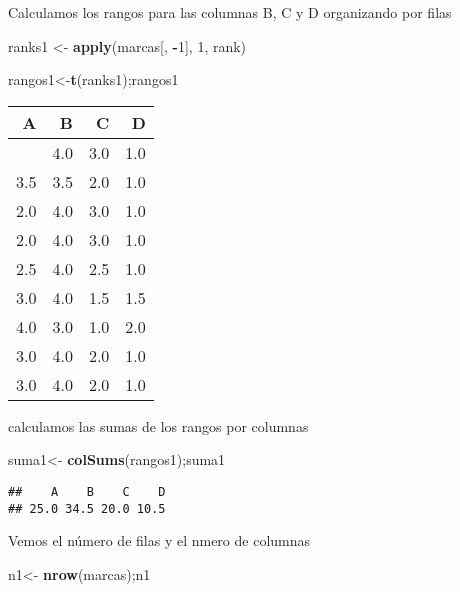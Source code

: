 \documentclass[
]{article}
\newenvironment{Shaded}{\begin{snugshade}}{\end{snugshade}}
\newcommand{\DecValTok}[1]{\textcolor[rgb]{0.00,0.00,0.81}{#1}}
\newcommand{\FunctionTok}[1]{\textcolor[rgb]{0.13,0.29,0.53}{\textbf{#1}}}
\newcommand{\NormalTok}[1]{#1}
\newcommand{\OtherTok}[1]{\textcolor[rgb]{0.56,0.35,0.01}{#1}}
\newcommand{\SpecialCharTok}[1]{\textcolor[rgb]{0.81,0.36,0.00}{\textbf{#1}}}
\begin{document}
Calculamos los rangos para las columnas B, C y D organizando por filas

\begin{Shaded}
\begin{Highlighting}[]
\NormalTok{ranks1 }\OtherTok{\textless{}{-}} \FunctionTok{apply}\NormalTok{(marcas[, }\SpecialCharTok{{-}}\DecValTok{1}\NormalTok{], }\DecValTok{1}\NormalTok{, rank)}


\NormalTok{rangos1}\OtherTok{\textless{}{-}}\FunctionTok{t}\NormalTok{(ranks1);rangos1}
\end{Highlighting}
\end{Shaded}

\begin{longtable}[]{@{}rrrr@{}}
\toprule\noalign{}
A & B & C & D \\
\midrule\noalign{}
\endhead
\bottomrule\noalign{}
\endlastfoot
2.0 & 4.0 & 3.0 & 1.0 \\
3.5 & 3.5 & 2.0 & 1.0 \\
2.0 & 4.0 & 3.0 & 1.0 \\
2.0 & 4.0 & 3.0 & 1.0 \\
2.5 & 4.0 & 2.5 & 1.0 \\
3.0 & 4.0 & 1.5 & 1.5 \\
4.0 & 3.0 & 1.0 & 2.0 \\
3.0 & 4.0 & 2.0 & 1.0 \\
3.0 & 4.0 & 2.0 & 1.0 \\
\end{longtable}

calculamos las sumas de los rangos por columnas

\begin{Shaded}
\begin{Highlighting}[]
\NormalTok{suma1}\OtherTok{\textless{}{-}} \FunctionTok{colSums}\NormalTok{(rangos1);suma1}
\end{Highlighting}
\end{Shaded}

\begin{verbatim}
##    A    B    C    D 
## 25.0 34.5 20.0 10.5
\end{verbatim}

Vemos el número de filas y el nmero de columnas

\begin{Shaded}
\begin{Highlighting}[]
\NormalTok{n1}\OtherTok{\textless{}{-}} \FunctionTok{nrow}\NormalTok{(marcas);n1}
\end{Highlighting}
\end{Shaded}
\end{document}
